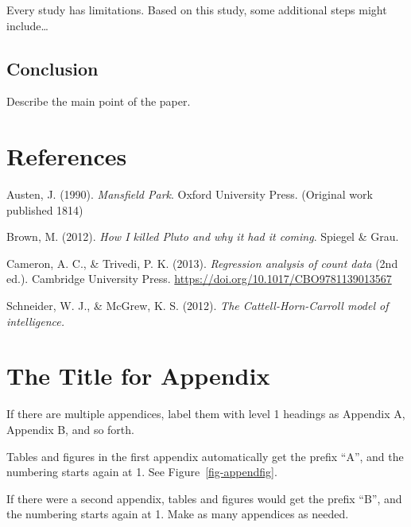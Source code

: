 \documentclass[
  jou,
  floatsintext,
  longtable,
  nolmodern,
  notxfonts,
  notimes,
  colorlinks=true,linkcolor=blue,citecolor=blue,urlcolor=blue]{apa7}
\newlength{\cslhangindent}
\newenvironment{CSLReferences}[2] %
 {\begin{list}{}{%
  \setlength{\itemindent}{0pt}
  \setlength{\leftmargin}{0pt}
  \setlength{\parsep}{0pt}
  \ifodd #1
   \setlength{\leftmargin}{\cslhangindent}
   \setlength{\itemindent}{-1\cslhangindent}
  \fi
  \setlength{\itemsep}{#2\baselineskip}}}
 {\end{list}}
\begin{document}
Every study has limitations. Based on this study, some additional steps
might include\ldots{}

\subsection{Conclusion}\label{conclusion}

Describe the main point of the paper.

\section{References}\label{references}

\label{refs}
\begin{CSLReferences}{1}{0}
Austen, J. (1990). \emph{Mansfield {P}ark}. Oxford University Press.
(Original work published 1814)

Brown, M. (2012). \emph{How {I} killed {Pluto} and why it had it
coming}. Spiegel \& Grau.

Cameron, A. C., \& Trivedi, P. K. (2013). \emph{Regression analysis of
count data} (2nd ed.). Cambridge University Press.
\url{https://doi.org/10.1017/CBO9781139013567}

Schneider, W. J., \& McGrew, K. S. (2012). \emph{The
{Cattell-Horn-Carroll} model of intelligence.}

\end{CSLReferences}

\appendix

\section{The Title for Appendix}\label{the-title-for-appendix}

If there are multiple appendices, label them with level 1 headings as
Appendix A, Appendix B, and so forth.

Tables and figures in the first appendix automatically get the prefix
``A'', and the numbering starts again at 1. See
Figure~\ref{fig-appendfig}.

If there were a second appendix, tables and figures would get the prefix
``B'', and the numbering starts again at 1. Make as many appendices as
needed.
\end{document}
